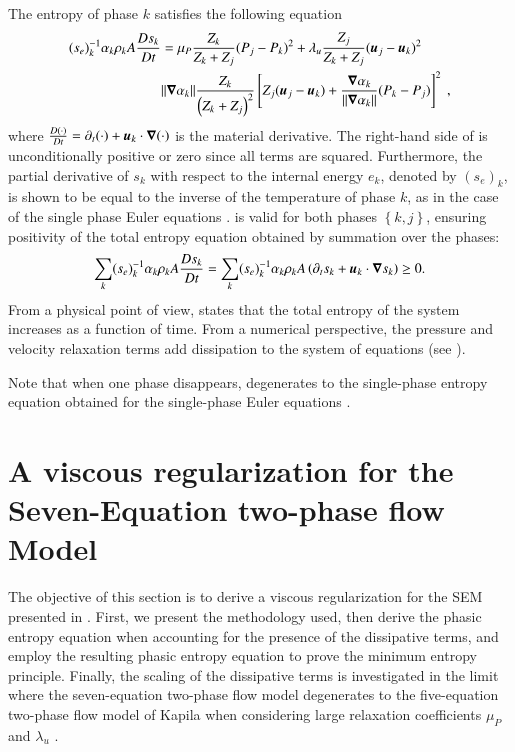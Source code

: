 \documentclass[preprint,10pt]{elsarticle}
\begin{document}
The entropy of phase $k$ satisfies the following equation
%
\begin{align} \label{eq:ent-eqn-7-eqn-model}
(s_{e})_k^{-1} \alpha_k \rho_k A \frac{Ds_k}{Dt} &= \mu_P \frac{Z_k}{Z_k+Z_j} (P_j - P_k)^2 + \lambda_u \frac{Z_j}{Z_k+Z_j} (\boldsymbol u_j -\boldsymbol u_k)^2 \nonumber
\\
& \| \boldsymbol\nabla \alpha_k \| \frac{Z_k}{\left( Z_k+Z_j \right)^2} \left[ Z_j (\boldsymbol u_j-\boldsymbol u_k)+\frac{\boldsymbol\nabla \alpha_k}{\| \boldsymbol\nabla \alpha_k \|}(P_k-P_j)\right]^2 \ ,
\end{align}
%
where $\frac{D(\cdot) }{Dt} = \partial_t (\cdot) + \boldsymbol u_k \cdot \boldsymbol\nabla (\cdot)$ is the material derivative.
The right-hand side of  is unconditionally positive or zero since all terms are squared. Furthermore, 
the partial derivative of $s_k$ with respect to the internal energy $e_k$, denoted by $(s_e)_k$, is shown to be equal to the inverse of the temperature 
of phase $k$, as in the case of the single phase Euler equations \cite{jlg, Marco_dissertation}.
 is valid for both phases $\left\{k, j\right\}$, ensuring positivity of the total entropy equation obtained by summation over the phases:
%
\begin{equation}\label{eq:tot-ent-res-sct4}
\sum_k (s_{e})_k^{-1} \alpha_k \rho_k A \frac{Ds_k}{Dt} = \sum_k (s_{e})_k^{-1} \alpha_k \rho_k A \left( \partial_t s_k + \boldsymbol u_k \cdot \boldsymbol\nabla s_k \right) \geq 0  .
\end{equation}
%
From a physical point of view,  states that the total entropy of the system increases as a function of time. From a numerical perspective, 
the pressure and velocity relaxation terms add dissipation to the system of equations (see ).

Note that when one phase disappears,  degenerates to the single-phase entropy equation obtained for the single-phase Euler equations \cite{SEM, Marco_dissertation}.

\section{A viscous regularization for the Seven-Equation two-phase flow Model}\label{sec:visc-regu}
%
The objective of this section is to derive a viscous regularization for the SEM presented in . First, we present the methodology used, 
then derive the phasic entropy equation when accounting for the presence of the dissipative terms, and employ the resulting phasic entropy equation to prove 
the minimum entropy principle. Finally, the scaling of the dissipative terms is investigated in the limit where the seven-equation two-phase flow model 
degenerates to the five-equation two-phase flow model of Kapila \cite{Kapila_2001} when considering large relaxation coefficients $\mu_P$ and $\lambda_u$ \cite{dellacherie}.
%
\end{document}
